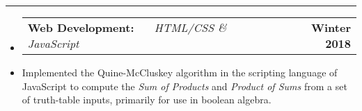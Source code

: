 \documentclass[10pt,letterpaper]{article}
\makeatletter
\newcommand{\header}[2]
{
	\begin{tabular*}{\linewidth}{l @{\extracolsep{\fill}} r}
		\hspace{-27pt} #1 & #2 \\
	\end{tabular*}
}
\makeatother
\begin{document}
\hrule

\begin{itemize}
	\item[]
		\header
			{	
				\textbf{Web Development: }
				\href{https://aashpointo.github.io/KmapWebsite/}{\emph{\underline{\smash{aashpointo.github.io/KmapWebsite}}}} \ \ \ \footnotesize \emph{HTML/CSS \& JavaScript}
				}
				{\textbf{Winter 2018}}
		\item
			Implemented the Quine-McCluskey algorithm in the scripting language of JavaScript to compute the \emph{Sum of Products} and \emph{Product of Sums} from a set of truth-table inputs, primarily for use in boolean algebra.

\end{itemize}
\end{document}
